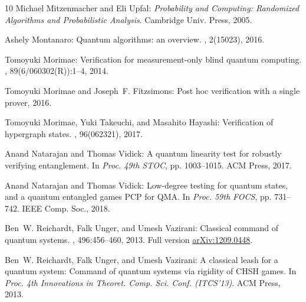 \documentclass[11pt]{article}
\numberwithin{equation}{section}
\theoremstyle{definition}
\theoremstyle{plain}
\begin{document}
\begin{thebibliography}{10}
{\sc Michael Mitzenmacher and Eli Upfal}: {\em Probability and Computing:
  Randomized Algorithms and Probabilistic Analysis}.
\newblock Cambridge Univ. Press, 2005.

{\sc Ashely Montanaro}: Quantum algorithms: an overview.
, 2(15023), 2016.

{\sc Tomoyuki Morimae}: Verification for measurement-only blind quantum
  computing.
, 89(6/060302(R)):1--4, 2014.

{\sc Tomoyuki Morimae and Joseph~F. Fitzsimons}: Post hoc verification with a
  single prover, 2016.

{\sc Tomoyuki Morimae, Yuki Takeuchi, and Masahito Hayashi}: Verification of
  hypergraph states.
, 96(062321), 2017.

{\sc Anand Natarajan and Thomas Vidick}: A quantum linearity test for robustly
  verifying entanglement.
\newblock In {\em Proc. 49th STOC}, pp. 1003--1015. ACM Press, 2017.
\newblock [\epfmtdoi{10.1145/3055399.3055468}]

{\sc Anand Natarajan and Thomas Vidick}: Low-degree testing for quantum states,
  and a quantum entangled games {PCP} for {QMA}.
\newblock In {\em Proc. 59th FOCS}, pp. 731--742. IEEE Comp. Soc., 2018.

{\sc Ben~W. Reichardt, Falk Unger, and Umesh Vazirani}: Classical command of
  quantum systems.
, 496:456--460, 2013.
\newblock Full version \href{https://arxiv.org/abs/1209.0448}{arXiv:1209.0448}.

{\sc Ben~W. Reichardt, Falk Unger, and Umesh Vazirani}: A classical leash for a
  quantum system: {C}ommand of quantum systems via rigidity of {CHSH} games.
\newblock In {\em Proc. 4th Innovations in Theoret. Comp. Sci. Conf.
  (ITCS'13)}. ACM Press, 2013.


\end{thebibliography}
\end{document}
